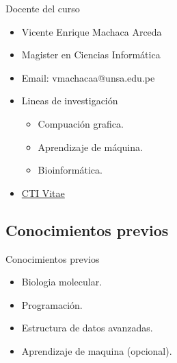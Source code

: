\documentclass[10pt]{beamer}
\newcommand{\chref}[2]{	\href{#1}{{\usebeamercolor[bg]{Feather}#2}} }
\newcommand{\chref}[3][blue]{\href{#2}{\color{#1}{#3}}}%
\newcommand{\1}{
        	\setbeamertemplate{background}{
        		\texttt{[image: img/1]}
        		\tikz[overlay] \fill[fill opacity=0.75,fill=white] (0,0) rectangle (-\paperwidth,\paperheight);
        	}
}
\begin{document}
\begin{frame}{Docente del curso}{}
\begin{itemize}
	\item Vicente Enrique Machaca Arceda
	\item Magister en Ciencias Informática
	\item Email: vmachacaa@unsa.edu.pe
	\item Lineas de investigación
	
		\begin{itemize}
			\item Compuación grafica.
			\item Aprendizaje de máquina.
			\item Bioinformática.	
		\end{itemize}
	
	\item  \chref{http://directorio.concytec.gob.pe/appDirectorioCTI/VerDatosInvestigador.do?id_investigador=22551}{CTI Vitae}
\end{itemize}
\end{frame}


\subsection{Conocimientos previos}

\begin{frame}{Conocimientos previos}{}	
\begin{itemize}
	\item Biologia molecular.
	\item Programación.
	\item Estructura de datos avanzadas.
	\item Aprendizaje de maquina (opcional).	
\end{itemize}
\end{frame}
\end{document}
